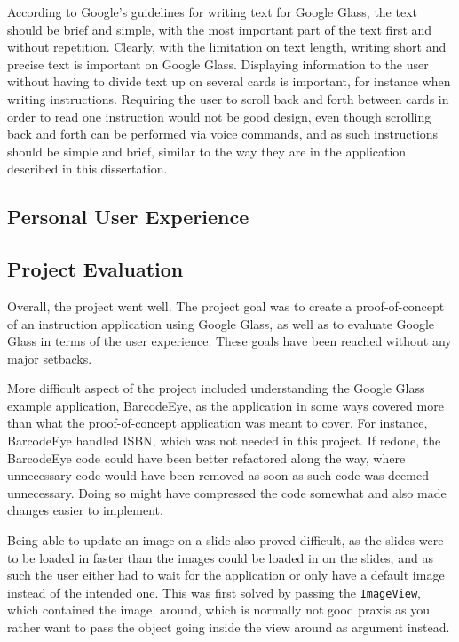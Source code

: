 According to Google's guidelines for writing text for Google Glass, the text should be brief and simple, with the most important part of the text first and without repetition. Clearly, with the limitation on text length, writing short and precise text is important on Google Glass. Displaying information to the user without having to divide text up on several cards is important, for instance when writing instructions. Requiring the user to scroll back and forth between cards in order to read one instruction would not be good design, even though scrolling back and forth can be performed via voice commands, and as such instructions should be simple and brief, similar to the way they are in the application described in this dissertation.

\subsection{Personal User Experience}
\label{subsec:personalexperience}


\subsection{Project Evaluation}
Overall, the project went well. The project goal was to create a proof-of-concept of an instruction application using Google Glass, as well as to evaluate Google Glass in terms of the user experience. These goals have been reached  without any major setbacks. 

More difficult aspect of the project included understanding the Google Glass example application, BarcodeEye, as the application in some ways covered more than what the proof-of-concept application was meant to cover. For instance, BarcodeEye handled ISBN, which was not needed in this project. If redone, the BarcodeEye code could have been better refactored along the way, where unnecessary code would have been removed as soon as such code was deemed unnecessary. Doing so might have compressed the code somewhat and also made changes easier to implement. 

Being able to update an image on a slide also proved difficult, as the slides were to be loaded in faster than the images could be loaded in on the slides, and as such the user either had to wait for the application or only have a default image instead of the intended one. This was first solved by passing the \texttt{ImageView}, which contained the image, around, which is normally not good praxis as you rather want to pass the object going inside the view around as argument instead.

